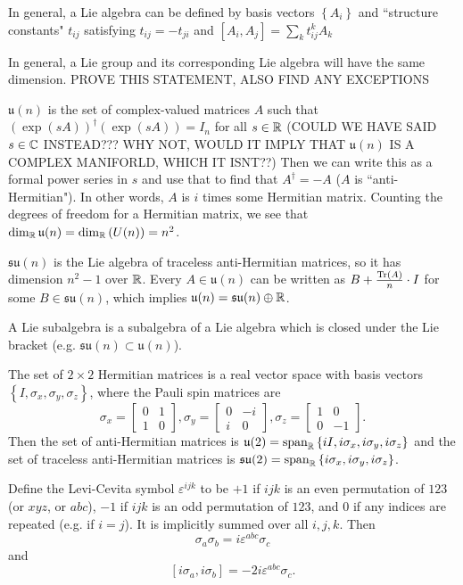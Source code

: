 \documentclass[class=article, crop=false]{standalone}
\begin{document}
In general, a Lie algebra can be defined by basis vectors $ \left\{ A_i \right\}$ and ``structure constants" $t_{ij}$ satisfying $t_{ij}=-t_{ji}$ and $[A_i,A_j]=\sum_k t_{ij}^k A_k$
\begin{thm}
    In general, a Lie group and its corresponding Lie algebra will have the same dimension. PROVE THIS STATEMENT, ALSO FIND ANY EXCEPTIONS
\end{thm}
\begin{example}
    $\mathfrak{u}(n)$ is the set of complex-valued matrices $A$ such that $ \left( \exp(sA) \right)^\dag \left( \exp(sA) \right)=I_n$ for all $s \in \mathbb{R}$ (COULD WE HAVE SAID $s \in \mathbb{C}$ INSTEAD??? WHY NOT, WOULD IT IMPLY THAT $\mathfrak{u}(n)$ IS A COMPLEX MANIFORLD, WHICH IT ISNT??) Then we can write this as a formal power series in $s$ and use that to find that $A^\dag=-A$ ($A$ is ``anti-Hermitian"). In other words, $A$ is $i$ times some Hermitian matrix. Counting the degrees of freedom for a Hermitian matrix, we see that $\dim_{\mathbb{R}} \mathfrak{u}(n) = \dim_{\mathbb{R}} \left( U(n) \right) =n^2$.
    \par
    $\mathfrak{su}(n)$ is the Lie algebra of traceless anti-Hermitian matrices, so it has dimension $n^2-1$ over $\mathbb{R}$. Every $A \in \mathfrak{u}(n)$ can be written as $B+ \frac{\operatorname{Tr}(A)}{n} \cdot I$ for some $B \in \mathfrak{su}(n)$, which implies $\mathfrak{u}(n) = \mathfrak{su}(n) \oplus \mathbb{R}$.
\end{example}
A Lie subalgebra is a subalgebra of a Lie algebra which is closed under the Lie bracket (e.g. $\mathfrak{su}(n) \subset \mathfrak{u}(n)$).
\par
The set of $2 \times 2$ Hermitian matrices is a real vector space with basis vectors $ \left\{ I, \sigma_x, \sigma_y, \sigma_z \right\}$, where the Pauli spin matrices are
\[ \sigma_x = \begin{bmatrix}
    0 & 1 \\
    1 & 0
\end{bmatrix}, \sigma_y = \begin{bmatrix}
    0 & -i \\
    i & 0
\end{bmatrix}, \sigma_z = \begin{bmatrix}
    1 & 0 \\
    0 & -1
\end{bmatrix}. \]
Then the set of anti-Hermitian matrices is $\mathfrak{u}(2)=\operatorname{span}_{\mathbb{R}} \left\{ iI, i \sigma_x, i\sigma_y, i \sigma_z \right\}$ and the set of traceless anti-Hermitian matrices is $\mathfrak{su}(2)=\operatorname{span}_{\mathbb{R}} \left\{ i \sigma_x, i \sigma_y, i \sigma_z \right\}$.
\par
Define the Levi-Cevita symbol $\varepsilon^{ijk}$ to be $+1$ if $ijk$ is an even permutation of $123$ (or $xyz$, or $abc$), $-1$ if $ijk$ is an odd permutation of $123$, and $0$ if any indices are repeated (e.g. if $i=j$). It is implicitly summed over all $i,j,k$. Then
\[ \sigma_a \sigma_b = i \varepsilon^{abc} \sigma_c \]
and
\[ [i \sigma_a, i \sigma_b] = -2i \varepsilon^{abc} \sigma_c. \]
\end{document}
